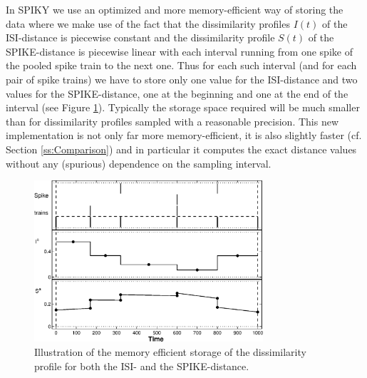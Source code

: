 \documentclass[10pt,twocolumn]{elsart5p}
\begin{document}
In SPIKY we use an optimized and more memory-efficient way of storing the data where we make use of the fact that the dissimilarity profiles $I (t)$ of the ISI-distance is piecewise constant and the dissimilarity profile $S (t)$ of the SPIKE-distance is piecewise linear with each interval running from one spike of the pooled spike train to the next one. Thus for each such interval (and for each pair of spike trains) we have to store only one value for the ISI-distance and two values for the SPIKE-distance, one at the beginning and one at the end of the interval (see Figure \ref{fig:No-sampling}). Typically the storage space required will be much smaller than for dissimilarity profiles sampled with a reasonable precision. This new implementation is not only far more memory-efficient, it is also slightly faster (cf. Section \ref{ss:Comparison}) and in particular it computes the exact distance values without any (spurious) dependence on the sampling interval.
%
%
\begin{figure}
    \includegraphics[width=85mm]{No_sampling.eps}
    \caption{\abb\label{fig:No-sampling} Illustration of the memory efficient storage of the dissimilarity profile for both the ISI- and the SPIKE-distance.}
\end{figure}
%
\end{document}

